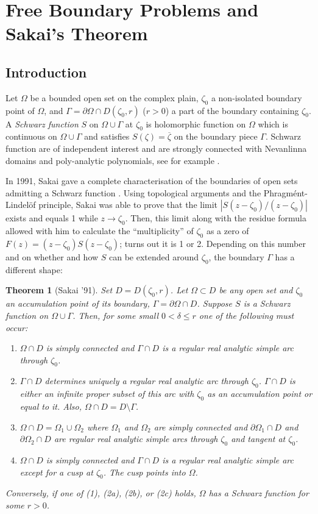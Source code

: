 \documentclass[11pt]{amsart} %
\newtheorem{theorem}{Theorem}%
\theoremstyle{remark} %
\theoremstyle{definition} %
\numberwithin{equation}{section} %
\newcommand{\bd}{\partial} %
\newcommand{\0}[1]{\overline{#1}} %
\newcommand{\1}[1]{\tilde{#1}} %
\newcommand{\2}[1]{{}_{|#1}} %
\begin{document}
\section{Free Boundary Problems and Sakai's Theorem}	\label{sec:Sakai}

\subsection*{Introduction}	%

Let $Ω$ be a bounded open set on the complex plain, $ζ_0$ a non-isolated boundary point of $Ω$, and $Γ=\bd Ω\cap D(ζ_0,r)$ ($r>0$) a part of the boundary containing $ζ_0$. A \emph{Schwarz function} $S$ on $Ω\cup Γ$ at $ζ_0$ is holomorphic function on $Ω$ which is continuous on $Ω\cup Γ$ and satisfies $S(ζ)=\0{ζ}$ on the boundary piece $Γ$. Schwarz function are of independent interest and are strongly connected with Nevanlinna domains and poly-analytic polynomials, see for example \cite{CarParFed2002,Fed2006}.

In 1991, Sakai gave a complete characterisation of the boundaries of open sets admitting a Schwarz function \cite{Sak1991}. Using topological arguments and the Phragm\'ent-Lindel\"of principle, Sakai was able to prove that the limit $|S(z-ζ_0)/(z-ζ_0)|$ exists and equals 1 while $z\to ζ_0$. Then, this limit along with the residue formula allowed with him to calculate the \enquote{multiplicity} of $ζ_0$ as a zero of $F(z)=(z-ζ_0)S(z-ζ_0)$; turns out it is 1 or 2. Depending on this number and on whether and how $S$ can be extended around $ζ_0$, the boundary $Γ$ has a different shape:
\begin{theorem}[Sakai '91]	\label{SakTheorem}
	Set $D=D(ζ_0,r)$. Let $Ω\subset D$ be any open set and $ζ_0$ an accumulation point of its boundary, $Γ=\bd Ω\cap D$. Suppose $S$ is a Schwarz function on $Ω\cup Γ$.	Then, for some small $0<δ\leq r$ one of the following must occur:
	\begin{enumerate}[(2a)]
		\item[(1)] $Ω\cap D$ is simply connected and $Γ\cap D$ is a regular real analytic simple arc through $ζ_0$.
		\item $Γ\cap D$ determines uniquely a regular real analytic arc through $ζ_0$. $Γ\cap D$ is either an infinite proper subset of this arc with $ζ_0$ as an accumulation point or equal to it. Also, $Ω\cap D=D\setminus Γ$.
		\item $Ω\cap D=Ω_1\cup Ω_2$ where $Ω_1$ and $Ω_2$ are simply connected and $\bd Ω_1\cap D$ and $\bd Ω_2\cap D$ are regular real analytic simple arcs through $ζ_0$ and tangent at $ζ_0$.
		\item $Ω\cap D$ is simply connected and $Γ\cap D$ is a regular real analytic simple arc except for a cusp at $ζ_0$. The cusp points into $Ω$.
	\end{enumerate}
	
	Conversely, if one of (1), (2a), (2b), or (2c) holds, $Ω$ has a Schwarz function for some $r>0$.
\end{theorem}
\end{document}
